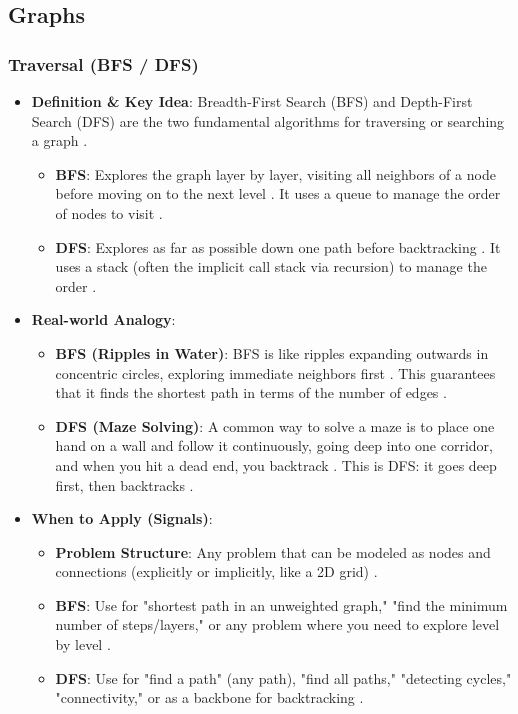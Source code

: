 \documentclass{article}
\begin{document}
\subsection{Graphs}
\subsubsection{Traversal (BFS / DFS)}
\begin{itemize}
\item \textbf{Definition \& Key Idea}: Breadth-First Search (BFS) and Depth-First Search (DFS) are the two fundamental algorithms for traversing or searching a graph \cite{581}.
\begin{itemize}
\item \textbf{BFS}: Explores the graph layer by layer, visiting all neighbors of a node before moving on to the next level \cite{583}. It uses a queue to manage the order of nodes to visit \cite{584}.
\item \textbf{DFS}: Explores as far as possible down one path before backtracking \cite{585}. It uses a stack (often the implicit call stack via recursion) to manage the order \cite{586}.
\end{itemize}
\item \textbf{Real-world Analogy}:
\begin{itemize}
\item \textbf{BFS (Ripples in Water)}: BFS is like ripples expanding outwards in concentric circles, exploring immediate neighbors first \cite{588, 589}. This guarantees that it finds the shortest path in terms of the number of edges \cite{590}.
\item \textbf{DFS (Maze Solving)}: A common way to solve a maze is to place one hand on a wall and follow it continuously, going deep into one corridor, and when you hit a dead end, you backtrack \cite{591, 592}. This is DFS: it goes deep first, then backtracks \cite{593}.
\end{itemize}
\item \textbf{When to Apply (Signals)}:
\begin{itemize}
\item \textbf{Problem Structure}: Any problem that can be modeled as nodes and connections (explicitly or implicitly, like a 2D grid) \cite{595}.
\item \textbf{BFS}: Use for "shortest path in an unweighted graph," "find the minimum number of steps/layers," or any problem where you need to explore level by level \cite{596, 600}.
\item \textbf{DFS}: Use for "find a path" (any path), "find all paths," "detecting cycles," "connectivity," or as a backbone for backtracking \cite{601}.
\end{itemize}
\end{itemize}
\end{document}

